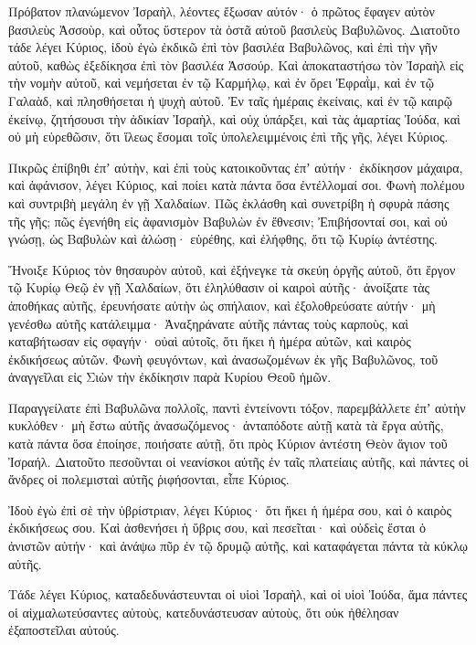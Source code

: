 {\par }{\PP {}Πρόβατον πλανώμενον Ἰσραὴλ, λέοντες ἔξωσαν αὐτόν· ὁ πρῶτος ἔφαγεν αὐτὸν βασιλεὺς Ἀσσοὺρ, καὶ οὗτος ὕστερον τὰ ὀστᾶ αὐτοῦ βασιλεὺς Βαβυλῶνος.
Διατοῦτο τάδε λέγει Κύριος, ἰδοὺ ἐγὼ ἐκδικῶ ἐπὶ τὸν βασιλέα Βαβυλῶνος, καὶ ἐπὶ τὴν γῆν αὐτοῦ, καθὼς ἐξεδίκησα ἐπὶ τὸν βασιλέα Ἀσσούρ.
Καὶ ἀποκαταστήσω τὸν Ἰσραὴλ εἰς τὴν νομὴν αὐτοῦ, καὶ νεμήσεται ἐν τῷ Καρμήλῳ, καὶ ἐν ὄρει Ἐφραῒμ, καὶ ἐν τῷ Γαλαὰδ, καὶ πλησθήσεται ἡ ψυχὴ αὐτοῦ.
Ἐν ταῖς ἡμέραις ἐκείναις, καὶ ἐν τῷ καιρῷ ἐκείνῳ, ζητήσουσι τὴν ἀδικίαν Ἰσραὴλ, καὶ οὐχ ὑπάρξει, καὶ τὰς ἁμαρτίας Ἰούδα, καὶ οὐ μὴ εὑρεθῶσιν, ὅτι ἵλεως ἔσομαι τοῖς ὑπολελειμμένοις ἐπὶ τῆς γῆς,
λέγει Κύριος.
\par }{\PP Πικρῶς ἐπίβηθι ἐπʼ αὐτὴν, καὶ ἐπὶ τοὺς κατοικοῦντας ἐπʼ αὐτήν· ἐκδίκησον μάχαιρα, καὶ ἀφάνισον, λέγει Κύριος, καὶ ποίει κατὰ πάντα ὅσα ἐντέλλομαί σοι.
Φωνὴ πολέμου καὶ συντριβὴ μεγάλη ἐν γῇ Χαλδαίων.
Πῶς ἐκλάσθη καὶ συνετρίβη ἡ σφυρὰ πάσης τῆς γῆς; πῶς ἐγενήθη εἰς ἀφανισμὸν Βαβυλὼν ἐν ἔθνεσιν;
Ἐπιβήσονταί σοι, καὶ οὐ γνώσῃ, ὡς Βαβυλὼν καὶ ἁλώσῃ· εὑρέθης, καὶ ἐλήφθης, ὅτι τῷ Κυρίῳ ἀντέστης.
\par }{\PP {}Ἤνοιξε Κύριος τὸν θησαυρὸν αὐτοῦ, καὶ ἐξήνεγκε τὰ σκεύη ὀργῆς αὐτοῦ, ὅτι ἔργον τῷ Κυρίῳ Θεῷ ἐν γῇ Χαλδαίων,
ὅτι ἐληλύθασιν οἱ καιροὶ αὐτῆς· ἀνοίξατε τὰς ἀποθήκας αὐτῆς, ἐρευνήσατε αὐτὴν ὡς σπήλαιον, καὶ ἐξολοθρεύσατε αὐτήν· μὴ γενέσθω αὐτῆς κατάλειμμα·
Ἀναξηράνατε αὐτῆς πάντας τοὺς καρποὺς, καὶ καταβήτωσαν εἰς σφαγήν· οὐαὶ αὐτοῖς, ὅτι ἥκει ἡ ἡμέρα αὐτῶν, καὶ καιρὸς ἐκδικήσεως αὐτῶν.
Φωνὴ φευγόντων, καὶ ἀνασωζομένων ἐκ γῆς Βαβυλῶνος, τοῦ ἀναγγεῖλαι εἰς Σιὼν τὴν ἐκδίκησιν παρὰ Κυρίου Θεοῦ ἡμῶν.
\par }{\PP {}Παραγγείλατε ἐπὶ Βαβυλῶνα πολλοῖς, παντὶ ἐντείνοντι τόξον, παρεμβάλλετε ἐπʼ αὐτὴν κυκλόθεν· μὴ ἔστω αὐτῆς ἀνασωζόμενος· ἀνταπόδοτε αὐτῇ κατὰ τὰ ἔργα αὐτῆς, κατὰ πάντα ὅσα ἐποίησε, ποιήσατε αὐτῇ, ὅτι πρὸς Κύριον ἀντέστη Θεὸν ἅγιον τοῦ Ἰσραήλ.
Διατοῦτο πεσοῦνται οἱ νεανίσκοι αὐτῆς ἐν ταῖς πλατείαις αὐτῆς, καὶ πάντες οἱ ἄνδρες οἱ πολεμισταὶ αὐτῆς ῥιφήσονται, εἶπε Κύριος.
\par }{\PP {}Ἰδοὺ ἐγὼ ἐπὶ σὲ τὴν ὑβρίστριαν, λέγει Κύριος· ὅτι ἥκει ἡ ἡμέρα σου, καὶ ὁ καιρὸς ἐκδικήσεως σου.
Καὶ ἀσθενήσει ἡ ὕβρις σου, καὶ πεσεῖται· καὶ οὐδεὶς ἔσται ὁ ἀνιστῶν αὐτήν· καὶ ἀνάψω πῦρ ἐν τῷ δρυμῷ αὐτῆς, καὶ καταφάγεται πάντα τὰ κύκλῳ αὐτῆς.
\par }{\PP {}Τάδε λέγει Κύριος, καταδεδυνάστευνται οἱ υἱοὶ Ἰσραὴλ, καὶ οἱ υἱοὶ Ἰούδα, ἅμα πάντες οἱ αἰχμαλωτεύσαντες αὐτοὺς, κατεδυνάστευσαν αὐτοὺς, ὅτι οὐκ ἠθέλησαν ἐξαποστεῖλαι αὐτούς.
}
